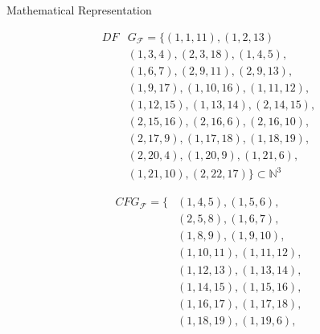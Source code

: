 \begin{blackbox}{Mathematical Representation}
    \centering
    \begin{minipage}{0.329\textwidth}
        \begin{graybox}
            \scriptsize
            \setlength{\abovedisplayskip}{0pt}
            \setlength{\belowdisplayskip}{0pt}
            \vspace{-0.5em}
            \begin{align*}
                DF&G_\mathcal F=\{(1,1,11),(1,2,13)\\[-0.5em]
                  &(1,3,4),(2,3,18),(1,4,5),\\[-0.5em]
                  &(1,6,7),(2,9,11),(2,9,13),\\[-0.5em]
                  &(1,9,17),(1,10,16),(1,11,12),\\[-0.5em]
                  &(1,12,15),(1,13,14),(2,14,15),\\[-0.5em]
                  &(2,15,16),(2,16,6),(2,16,10),\\[-0.5em]
                  &(2,17,9),(1,17,18),(1,18,19),\\[-0.5em]
                  &(2,20,4),(1,20,9),(1,21,6),\\[-0.5em]
                  &(1,21,10),(2,22,17)\}\subset\mathbb N^3
            \end{align*}
        \end{graybox}
    \end{minipage}
    \begin{minipage}{0.329\textwidth}
        \begin{graybox}
            \scriptsize
            \setlength{\abovedisplayskip}{0pt}
            \setlength{\belowdisplayskip}{0pt}
            \vspace{-0.5em}
            \begin{align*}
                CFG_\mathcal F=\{&(1,4,5),(1,5,6),\\[-0.5em]
                  &(2,5,8),(1,6,7),\\[-0.5em]
                  &(1,8,9),(1,9,10),\\[-0.5em]
                  &(1,10,11),(1,11,12),\\[-0.5em]
                  &(1,12,13),(1,13,14),\\[-0.5em]
                  &(1,14,15),(1,15,16),\\[-0.5em]
                  &(1,16,17),(1,17,18),\\[-0.5em]
                  &(1,18,19),(1,19,6),\\[-0.5em]

\end{align*}
\end{graybox}
\end{minipage}
\end{blackbox}
